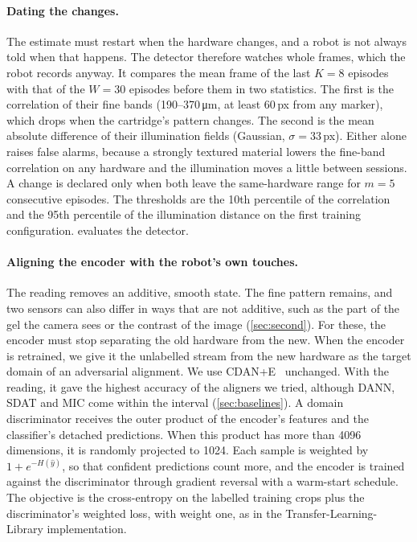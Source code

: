 \paragraph{Dating the changes.}
The estimate must restart when the hardware changes, and a robot is not always told when that happens. The detector therefore watches whole frames, which the robot records anyway. It compares the mean frame of the last $K\!=\!8$ episodes with that of the $W\!=\!30$ episodes before them in two statistics. The first is the correlation of their fine bands (190--370\,\si{\micro\metre}, at least 60\,px from any marker), which drops when the cartridge's pattern changes. The second is the mean absolute difference of their illumination fields (Gaussian, $\sigma\!=\!33$\,px). Either alone raises false alarms, because a strongly textured material lowers the fine-band correlation on any hardware and the illumination moves a little between sessions. A change is declared only when both leave the same-hardware range for $m\!=\!5$ consecutive episodes. The thresholds are the 10th percentile of the correlation and the 95th percentile of the illumination distance on the first training configuration.  evaluates the detector.

\paragraph{Aligning the encoder with the robot's own touches.}
The reading removes an additive, smooth state. The fine pattern remains, and two sensors can also differ in ways that are not additive, such as the part of the gel the camera sees or the contrast of the image (\cref{sec:second}). For these, the encoder must stop separating the old hardware from the new. When the encoder is retrained, we give it the unlabelled stream from the new hardware as the target domain of an adversarial alignment. We use CDAN+E~\cite{long2018cdan} unchanged. With the reading, it gave the highest accuracy of the aligners we tried, although DANN, SDAT and MIC come within the interval (\cref{sec:baselines}). A domain discriminator receives the outer product of the encoder's features and the classifier's detached predictions. When this product has more than 4096 dimensions, it is randomly projected to 1024. Each sample is weighted by $1 + e^{-H(\hat y)}$, so that confident predictions count more, and the encoder is trained against the discriminator through gradient reversal with a warm-start schedule. The objective is the cross-entropy on the labelled training crops plus the discriminator's weighted loss, with weight one, as in the Transfer-Learning-Library implementation.

